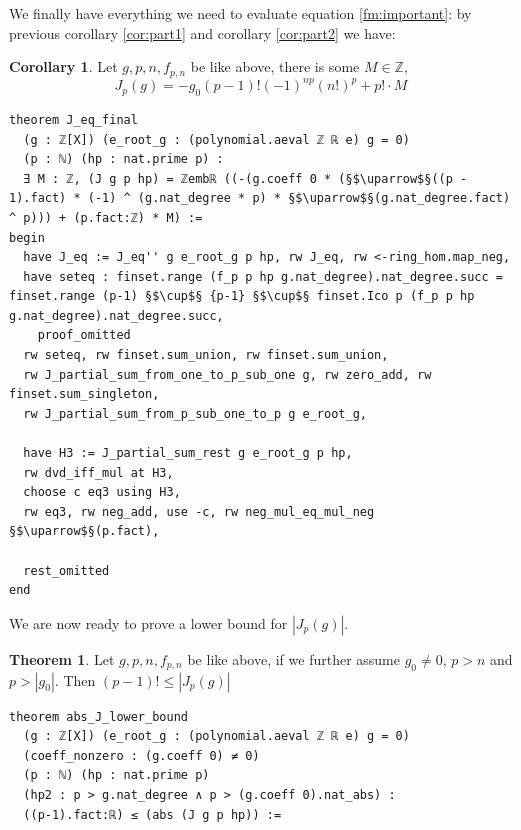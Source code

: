 \documentclass{report}
\theoremstyle{definition}
\newtheorem{theorem}{Theorem}[section]
\newtheorem{corollary}{Corollary}[section]
\begin{document}
We finally have everything we need to evaluate equation \ref{fm:important}: by previous corollary \ref{cor:part1} and corollary \ref{cor:part2} we have:
\begin{corollary}
Let $g,p,n,f_{p,n}$ be like above, there is some $M\in\mathbb Z$,
$$
J_p(g)=-g_0(p-1)!(-1)^{np} (n!)^p + p!\cdot M
$$
\begin{verbatim}
theorem J_eq_final 
  (g : ℤ[X]) (e_root_g : (polynomial.aeval ℤ ℝ e) g = 0) 
  (p : ℕ) (hp : nat.prime p) : 
  ∃ M : ℤ, (J g p hp) = ℤembℝ ((-(g.coeff 0 * (§$\uparrow$§((p - 1).fact) * (-1) ^ (g.nat_degree * p) * §$\uparrow$§(g.nat_degree.fact) ^ p))) + (p.fact:ℤ) * M) :=
begin
  have J_eq := J_eq'' g e_root_g p hp, rw J_eq, rw <-ring_hom.map_neg,
  have seteq : finset.range (f_p p hp g.nat_degree).nat_degree.succ = finset.range (p-1) §$\cup$§ {p-1} §$\cup$§ finset.Ico p (f_p p hp g.nat_degree).nat_degree.succ,
    proof_omitted
  rw seteq, rw finset.sum_union, rw finset.sum_union, 
  rw J_partial_sum_from_one_to_p_sub_one g, rw zero_add, rw finset.sum_singleton,
  rw J_partial_sum_from_p_sub_one_to_p g e_root_g,
  
  have H3 := J_partial_sum_rest g e_root_g p hp,
  rw dvd_iff_mul at H3,
  choose c eq3 using H3,
  rw eq3, rw neg_add, use -c, rw neg_mul_eq_mul_neg §$\uparrow$§(p.fact),

  rest_omitted
end
\end{verbatim}
\end{corollary}

We are now ready to prove a lower bound for $|J_p(g)|$.
\begin{theorem}
Let $g,p,n,f_{p,n}$ be like above, if we further assume $g_0\ne 0$, $p>n$ and $p>|g_0|$. Then $(p-1)!\le |J_p(g)|$
\begin{verbatim}
theorem abs_J_lower_bound 
  (g : ℤ[X]) (e_root_g : (polynomial.aeval ℤ ℝ e) g = 0) 
  (coeff_nonzero : (g.coeff 0) ≠ 0) 
  (p : ℕ) (hp : nat.prime p) 
  (hp2 : p > g.nat_degree ∧ p > (g.coeff 0).nat_abs) : 
  ((p-1).fact:ℝ) ≤ (abs (J g p hp)) :=
\end{verbatim}
\end{theorem}
\end{document}
